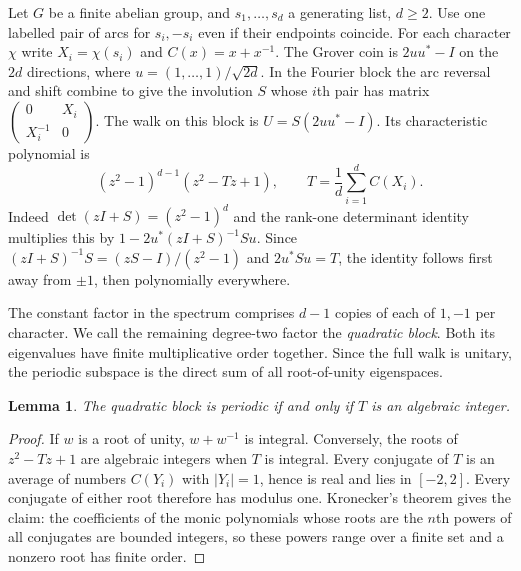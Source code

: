 \documentclass[10pt]{article}
\newtheorem{lemma}[theorem]{Lemma}
\begin{document}
Let $G$ be a finite abelian group, and $s_1,\ldots,s_d$ a generating list,
$d\ge2$. Use one labelled pair of arcs for $s_i,-s_i$ even if their
endpoints coincide. For each character $\chi$ write $X_i=\chi(s_i)$ and
$C(x)=x+x^{-1}$. The Grover coin is $2uu^*-I$ on the $2d$ directions,
where $u=(1,\ldots,1)/\sqrt{2d}$. In the Fourier block the arc reversal
and shift combine to give the involution $S$ whose $i$th pair has matrix
$\left(\begin{smallmatrix}0&X_i\\X_i^{-1}&0\end{smallmatrix}\right)$.
The walk on this block is $U=S(2uu^*-I)$. Its characteristic polynomial is
\begin{equation}\label{eq:fourier}
 (z^2-1)^{d-1}(z^2-Tz+1),
 \qquad T=\frac1d\sum_{i=1}^d C(X_i).
\end{equation}
Indeed $\det(zI+S)=(z^2-1)^d$ and the rank-one determinant identity
multiplies this by $1-2u^*(zI+S)^{-1}Su$. Since
$(zI+S)^{-1}S=(zS-I)/(z^2-1)$ and $2u^*Su=T$, the identity follows
first away from $\pm1$, then polynomially everywhere.

The constant factor in the spectrum comprises $d-1$ copies of each of
$1,-1$ per character. We call the remaining degree-two factor the
\emph{quadratic block}. Both its eigenvalues have finite multiplicative
order together. Since the full walk is unitary, the periodic subspace
is the direct sum of all root-of-unity eigenspaces.

\begin{lemma}\label{l:int}
The quadratic block is periodic if and only if $T$ is an algebraic integer.
\end{lemma}
\begin{proof}
If $w$ is a root of unity, $w+w^{-1}$ is integral. Conversely,
the roots of $z^2-Tz+1$ are algebraic integers when $T$ is integral.
Every conjugate of $T$ is an average of numbers $C(Y_i)$ with
$|Y_i|=1$, hence is real and lies in $[-2,2]$. Every conjugate of either
root therefore has modulus one. Kronecker's theorem gives the claim:
the coefficients of the monic polynomials whose roots are the $n$th
powers of all conjugates are bounded integers, so these powers range over
a finite set and a nonzero root has finite order.
\end{proof}
\end{document}
